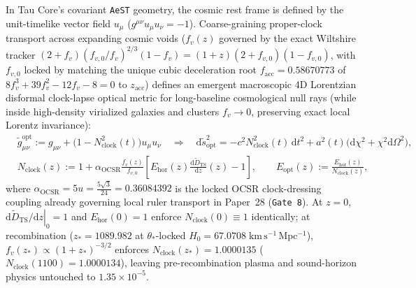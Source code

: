 \documentclass[11pt,a4paper]{article}
\begin{document}
In Tau Core's covariant \texttt{AeST} geometry, the cosmic rest frame is defined by the unit-timelike vector field $u_\mu$ ($g^{\mu\nu}u_\mu u_\nu = -1$). Coarse-graining proper-clock transport across expanding cosmic voids ($f_v(z)$ governed by the exact Wiltshire tracker $(2+f_v)(f_{v,0}/f_v)^{2/3}(1-f_v) = (1+z)(2+f_{v,0})(1-f_{v,0})$, with $f_{v,0}$ locked by matching the unique cubic deceleration root $f_{\mathrm{acc}} = 0.58670773$ of $8f_v^3 + 39f_v^2 - 12f_v - 8 = 0$ to $z_{\mathrm{acc}}$) defines an emergent macroscopic 4D Lorentzian disformal clock-lapse optical metric for long-baseline cosmological null rays (while inside high-density virialized galaxies and clusters $f_v \to 0$, preserving exact local Lorentz invariance):
\begin{equation}
\begin{aligned}
    &\tilde{g}_{\mu\nu}^{\mathrm{opt}} := g_{\mu\nu} + \bigl(1 - N_{\mathrm{clock}}^2(t)\bigr)u_\mu u_\nu \quad\Longrightarrow\quad \mathrm{d}\tilde{s}_{\mathrm{opt}}^2 = -c^2 N_{\mathrm{clock}}^2(t)\,\mathrm{d}t^2 + a^2(t)\bigl(\mathrm{d}\chi^2 + \chi^2\mathrm{d}\Omega^2\bigr), \\
    &N_{\mathrm{clock}}(z) := 1 + \alpha_{\mathrm{OCSR}}\frac{f_v(z)}{f_{v,0}}\!\left[E_{\mathrm{hor}}(z)\frac{\mathrm{d}\widetilde{D}_{\mathrm{TS}}}{\mathrm{d}z}(z) - 1\right], \qquad E_{\mathrm{opt}}(z) := \frac{E_{\mathrm{hor}}(z)}{N_{\mathrm{clock}}(z)},
\end{aligned}
\label{eq:disformal-metric}
\end{equation}
where $\alpha_{\mathrm{OCSR}} = 5u = \frac{5\sqrt{3}}{24} = 0.36084392$ is the locked OCSR clock-dressing coupling already governing local ruler transport in Paper~28 (\texttt{Gate~8}). At $z = 0$, $\left.\mathrm{d}\widetilde{D}_{\mathrm{TS}}/\mathrm{d}z\right|_0 = 1$ and $E_{\mathrm{hor}}(0) = 1$ enforce $N_{\mathrm{clock}}(0) \equiv 1$ identically; at recombination ($z_* = 1089.982$ at $\theta_*$-locked $H_0 = 67.0708\;\mathrm{km\,s^{-1}\,Mpc^{-1}}$), $f_v(z_*) \propto (1+z_*)^{-3/2}$ enforces $N_{\mathrm{clock}}(z_*) = 1.0000135$ ($N_{\mathrm{clock}}(1100) = 1.0000134$), leaving pre-recombination plasma and sound-horizon physics untouched to $1.35\times 10^{-5}$.
\end{document}
